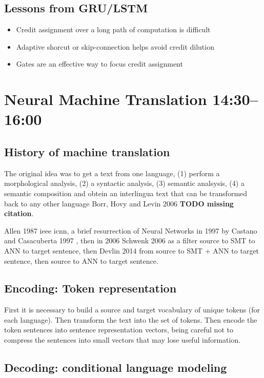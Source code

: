 \documentclass[b5paper]{report}
\begin{document}
\subsection{Lessons from GRU/LSTM}

\begin{itemize}
  \item Credit assignment over a long path of computation is difficult
    \item Adaptive shorcut or skip-connection helps avoid credit dilution
      \item Gates are an effective way to focus credit assignment
\end{itemize}

\section{Neural Machine Translation 14:30--16:00}

\subsection{History of machine translation}

The original idea was to get a text from one language, (1) perform a
morphological analysis, (2) a syntactic analysis, (3) semantic analsysis, (4) a
semantic composition and obtein an interlingua text that can be transformed
back to any other language Borr, Hovy and Levin 2006 \textbf{TODO missing
citation}.

Allen 1987 ieee icnn, a brief resurrection of Neural Networks in 1997 by
Castano and Casacuberta 1997 \cite{castano1997machine}, then in 2006 Schwenk
2006 \cite{schwenk2006continuous} as a filter source to SMT to \gls{ANN} to target sentence, then Devlin 2014 from
source to SMT + \gls{ANN} to target sentence, then source to
\gls{ANN} to target sentence.

\subsection{Encoding: Token representation}

First it is necessary to build a source and target vocabulary of unique tokens
(for each language). Then transform the text into the set of tokens. Then
encode the token sentences into sentence representation vectors, being careful
not to compress the sentences into small vectors that may lose useful
information.


\subsection{Decoding: conditional language modeling}
\end{document}
